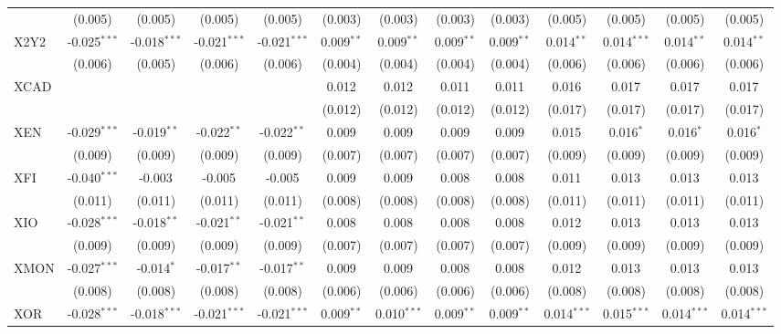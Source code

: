 \begin{table}[!htbp]
\begin{tabular}{@{\extracolsep{5pt}}lcccccccccccc}
  & (0.005) & (0.005) & (0.005) & (0.005) & (0.003) & (0.003) & (0.003) & (0.003) & (0.005) & (0.005) & (0.005) & (0.005) \\
 X2Y2 & -0.025$^{***}$ & -0.018$^{***}$ & -0.021$^{***}$ & -0.021$^{***}$ & 0.009$^{**}$ & 0.009$^{**}$ & 0.009$^{**}$ & 0.009$^{**}$ & 0.014$^{**}$ & 0.014$^{***}$ & 0.014$^{**}$ & 0.014$^{**}$ \\
  & (0.006) & (0.005) & (0.006) & (0.006) & (0.004) & (0.004) & (0.004) & (0.004) & (0.006) & (0.006) & (0.006) & (0.006) \\
 XCAD & & & & & 0.012$^{}$ & 0.012$^{}$ & 0.011$^{}$ & 0.011$^{}$ & 0.016$^{}$ & 0.017$^{}$ & 0.017$^{}$ & 0.017$^{}$ \\
  & & & & & (0.012) & (0.012) & (0.012) & (0.012) & (0.017) & (0.017) & (0.017) & (0.017) \\
 XEN & -0.029$^{***}$ & -0.019$^{**}$ & -0.022$^{**}$ & -0.022$^{**}$ & 0.009$^{}$ & 0.009$^{}$ & 0.009$^{}$ & 0.009$^{}$ & 0.015$^{}$ & 0.016$^{*}$ & 0.016$^{*}$ & 0.016$^{*}$ \\
  & (0.009) & (0.009) & (0.009) & (0.009) & (0.007) & (0.007) & (0.007) & (0.007) & (0.009) & (0.009) & (0.009) & (0.009) \\
 XFI & -0.040$^{***}$ & -0.003$^{}$ & -0.005$^{}$ & -0.005$^{}$ & 0.009$^{}$ & 0.009$^{}$ & 0.008$^{}$ & 0.008$^{}$ & 0.011$^{}$ & 0.013$^{}$ & 0.013$^{}$ & 0.013$^{}$ \\
  & (0.011) & (0.011) & (0.011) & (0.011) & (0.008) & (0.008) & (0.008) & (0.008) & (0.011) & (0.011) & (0.011) & (0.011) \\
 XIO & -0.028$^{***}$ & -0.018$^{**}$ & -0.021$^{**}$ & -0.021$^{**}$ & 0.008$^{}$ & 0.008$^{}$ & 0.008$^{}$ & 0.008$^{}$ & 0.012$^{}$ & 0.013$^{}$ & 0.013$^{}$ & 0.013$^{}$ \\
  & (0.009) & (0.009) & (0.009) & (0.009) & (0.007) & (0.007) & (0.007) & (0.007) & (0.009) & (0.009) & (0.009) & (0.009) \\
 XMON & -0.027$^{***}$ & -0.014$^{*}$ & -0.017$^{**}$ & -0.017$^{**}$ & 0.009$^{}$ & 0.009$^{}$ & 0.008$^{}$ & 0.008$^{}$ & 0.012$^{}$ & 0.013$^{}$ & 0.013$^{}$ & 0.013$^{}$ \\
  & (0.008) & (0.008) & (0.008) & (0.008) & (0.006) & (0.006) & (0.006) & (0.006) & (0.008) & (0.008) & (0.008) & (0.008) \\
 XOR & -0.028$^{***}$ & -0.018$^{***}$ & -0.021$^{***}$ & -0.021$^{***}$ & 0.009$^{**}$ & 0.010$^{***}$ & 0.009$^{**}$ & 0.009$^{**}$ & 0.014$^{***}$ & 0.015$^{***}$ & 0.014$^{***}$ & 0.014$^{***}$ \\

\end{tabular}
\end{table}
